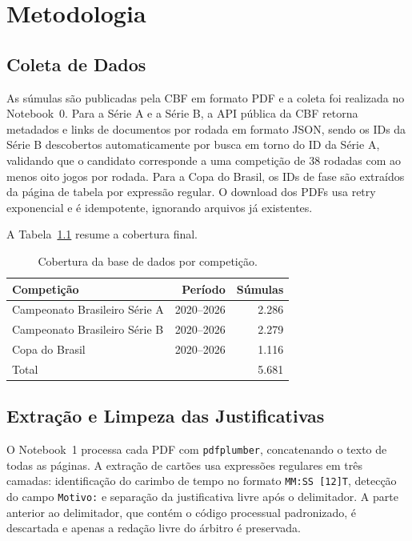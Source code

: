 \documentclass[
12pt,
openany,
oneside,
a4paper,
chapter=TITLE,
english,
french,
spanish,
brazil
]{USPSC-classe/USPSC}
\begin{document}
\chapter{Metodologia}

\section{Coleta de Dados}

As súmulas são publicadas pela CBF em formato PDF \cite{cbf2024sumulas} e a coleta foi realizada no Notebook~0. Para a Série A e a Série B, a API pública da CBF retorna metadados e links de documentos por rodada em formato JSON, sendo os IDs da Série B descobertos automaticamente por busca em torno do ID da Série A, validando que o candidato corresponde a uma competição de 38 rodadas com ao menos oito jogos por rodada. Para a Copa do Brasil, os IDs de fase são extraídos da página de tabela por expressão regular. O download dos PDFs usa retry exponencial e é idempotente, ignorando arquivos já existentes.

A Tabela~\ref{tab-cobertura} resume a cobertura final.

\begin{table}[!htp]
  \centering
  \caption{Cobertura da base de dados por competição.}
  \label{tab-cobertura}
  \begin{tabular}{lrr}
    \toprule
    Competição & Período & Súmulas \\
    \midrule
    Campeonato Brasileiro Série A & 2020--2026 & 2.286 \\
    Campeonato Brasileiro Série B & 2020--2026 & 2.279 \\
    Copa do Brasil & 2020--2026 & 1.116 \\
    \midrule
    Total & & 5.681 \\
    \bottomrule
  \end{tabular}
\end{table}

\FloatBarrier

\section{Extração e Limpeza das Justificativas}

O Notebook~1 processa cada PDF com \texttt{pdfplumber}, concatenando o texto de todas as páginas. A extração de cartões usa expressões regulares em três camadas: identificação do carimbo de tempo no formato \texttt{MM:SS [12]T}, detecção do campo \texttt{Motivo:} e separação da justificativa livre após o delimitador. A parte anterior ao delimitador, que contém o código processual padronizado, é descartada e apenas a redação livre do árbitro é preservada.
\end{document}
